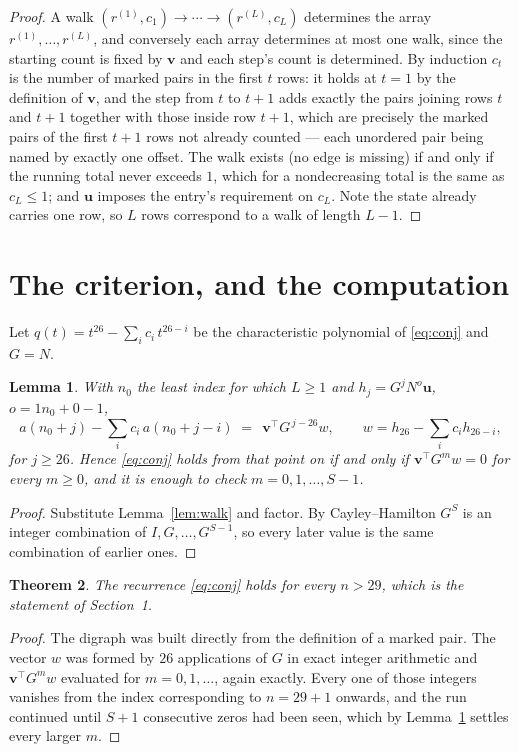 \documentclass[11pt,a4paper]{article}
\theoremstyle{plain}
\newtheorem{theorem}{Theorem}
\newtheorem{lemma}[theorem]{Lemma}
\theoremstyle{definition}
\begin{document}
\begin{proof}
A walk $(r^{(1)},c_1)\to\cdots\to(r^{(L)},c_L)$ determines the array
$r^{(1)},\dots,r^{(L)}$, and conversely each array determines at most one walk, since the
starting count is fixed by $\mathbf{v}$ and each step's count is determined. By induction
$c_t$ is the number of marked pairs in the first $t$ rows: it holds at $t=1$ by the
definition of $\mathbf{v}$, and the step from $t$ to $t+1$ adds exactly the pairs joining
rows $t$ and $t+1$ together with those inside row $t+1$, which are precisely the marked
pairs of the first $t+1$ rows not already counted --- each unordered pair being named by
exactly one offset. The walk exists (no edge is missing) if and only if the running total
never exceeds $1$, which for a nondecreasing total is the same as $c_L\le1$; and
$\mathbf{u}$ imposes the entry's requirement on $c_L$. Note the state already carries one
row, so $L$ rows correspond to a walk of length $L-1$.
\end{proof}

\section{The criterion, and the computation}

Let $q(t)=t^{26}-\sum_i c_i\,t^{26-i}$ be the characteristic polynomial of
\eqref{eq:conj} and $G=N$.

\begin{lemma}\label{lem:crit}
With $n_0$ the least index for which $L\ge1$ and $h_j=G^{j}N^{o}\mathbf{u}$,
$o=1n_0+0-1$,
\[
a(n_0+j)-\sum_i c_i\,a(n_0+j-i)\;=\;\,\mathbf{v}^{\!\top}G^{\,j-26}w,
\qquad w=h_{26}-\sum_i c_i h_{26-i},
\]
for $j\ge26$. Hence \eqref{eq:conj} holds from that point on if and only if
$\mathbf{v}^{\!\top}G^{m}w=0$ for every $m\ge0$, and it is enough to check
$m=0,1,\dots,S-1$.
\end{lemma}

\begin{proof}
Substitute Lemma~\ref{lem:walk} and factor. By Cayley--Hamilton $G^{S}$ is an integer
combination of $I,G,\dots,G^{S-1}$, so every later value is the same combination of earlier
ones.
\end{proof}

\begin{theorem}
The recurrence \eqref{eq:conj} holds for every $n>29$, which is the statement of
Section~1.
\end{theorem}

\begin{proof}
The digraph was built directly from the definition of a marked pair. The vector $w$ was
formed by $26$ applications of $G$ in exact integer arithmetic and
$\mathbf{v}^{\!\top}G^{m}w$ evaluated for $m=0,1,\dots$, again exactly. Every one of
those integers vanishes from the index corresponding to $n=29+1$ onwards, and the run
continued until $S+1$ consecutive zeros had been seen, which by Lemma~\ref{lem:crit}
settles every larger $m$.
\end{proof}
\end{document}
